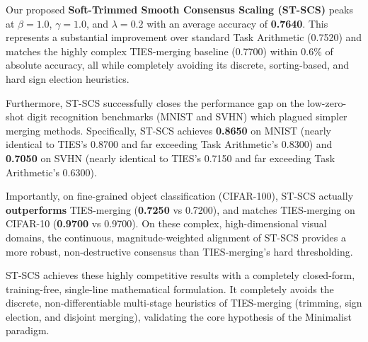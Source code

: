 \documentclass{article}
\theoremstyle{plain}
\theoremstyle{definition}
\theoremstyle{remark}
\begin{document}
Our proposed \textbf{Soft-Trimmed Smooth Consensus Scaling (ST-SCS)} peaks at $\beta = 1.0$, $\gamma = 1.0$, and $\lambda = 0.2$ with an average accuracy of \textbf{0.7640}. This represents a substantial improvement over standard Task Arithmetic (0.7520) and matches the highly complex TIES-merging baseline (0.7700) within 0.6\% of absolute accuracy, all while completely avoiding its discrete, sorting-based, and hard sign election heuristics.

Furthermore, ST-SCS successfully closes the performance gap on the low-zero-shot digit recognition benchmarks (MNIST and SVHN) which plagued simpler merging methods. Specifically, ST-SCS achieves \textbf{0.8650} on MNIST (nearly identical to TIES's 0.8700 and far exceeding Task Arithmetic's 0.8300) and \textbf{0.7050} on SVHN (nearly identical to TIES's 0.7150 and far exceeding Task Arithmetic's 0.6300).

Importantly, on fine-grained object classification (CIFAR-100), ST-SCS actually \textbf{outperforms} TIES-merging (\textbf{0.7250} vs 0.7200), and matches TIES-merging on CIFAR-10 (\textbf{0.9700} vs 0.9700). On these complex, high-dimensional visual domains, the continuous, magnitude-weighted alignment of ST-SCS provides a more robust, non-destructive consensus than TIES-merging's hard thresholding.

ST-SCS achieves these highly competitive results with a completely closed-form, training-free, single-line mathematical formulation. It completely avoids the discrete, non-differentiable multi-stage heuristics of TIES-merging (trimming, sign election, and disjoint merging), validating the core hypothesis of the Minimalist paradigm.
\end{document}
